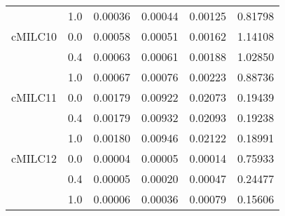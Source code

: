 \begin{longtable}{cccccc}
     & 1.0 & 0.00036 & 0.00044 & 0.00125 & 0.81798 \\
cMILC10 & 0.0 & 0.00058 & 0.00051 & 0.00162 & 1.14108 \\
     & 0.4 & 0.00063 & 0.00061 & 0.00188 & 1.02850 \\
     & 1.0 & 0.00067 & 0.00076 & 0.00223 & 0.88736 \\
cMILC11 & 0.0 & 0.00179 & 0.00922 & 0.02073 & 0.19439 \\
     & 0.4 & 0.00179 & 0.00932 & 0.02093 & 0.19238 \\
     & 1.0 & 0.00180 & 0.00946 & 0.02122 & 0.18991 \\
cMILC12 & 0.0 & 0.00004 & 0.00005 & 0.00014 & 0.75933 \\
     & 0.4 & 0.00005 & 0.00020 & 0.00047 & 0.24477 \\
     & 1.0 & 0.00006 & 0.00036 & 0.00079 & 0.15606 \\
\end{longtable}
